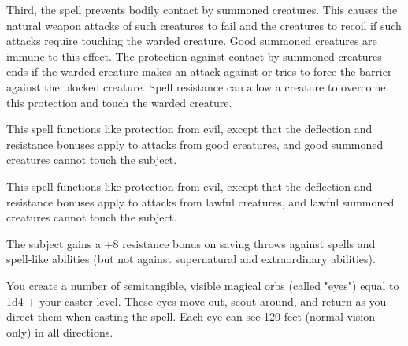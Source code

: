 \begin{multicols}{2}
\begin{small}
\smallskip\noindent Third, the spell prevents bodily contact by summoned creatures. This causes the natural weapon attacks of such creatures to fail and the creatures to recoil if such attacks require touching the warded creature. Good summoned creatures are immune to this effect. The protection against contact by summoned creatures ends if the warded creature makes an attack against or tries to force the barrier against the blocked creature. Spell resistance can allow a creature to overcome this protection and touch the warded creature.


\noindent This spell functions like protection from evil, except that the deflection and resistance bonuses apply to attacks from good creatures, and good summoned creatures cannot touch the subject.

\noindent This spell functions like protection from evil, except that the deflection and resistance bonuses apply to attacks from lawful creatures, and lawful summoned creatures cannot touch the subject.

\noindent The subject gains a +8 resistance bonus on saving throws against spells and spell-like abilities (but not against supernatural and extraordinary abilities).


\noindent You create a number of semitangible, visible magical orbs (called "eyes") equal to 1d4 + your caster level. These eyes move out, scout around, and return as you direct them when casting the spell. Each eye can see 120 feet (normal vision only) in all directions.


\end{small}
\end{multicols}
